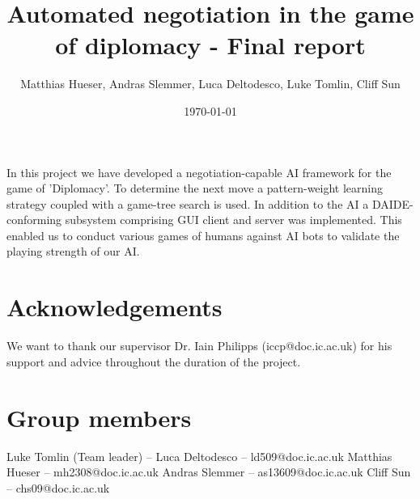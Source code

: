 \documentclass[11pt]{article} \usepackage{fullpage} \usepackage{cite}
\title{Automated negotiation in the game of diplomacy - Final report}
\author{Matthias Hueser, Andras Slemmer, Luca Deltodesco, Luke Tomlin, Cliff
  Sun} \date{\today}
\begin{document}
\maketitle

\begin{Abstract}

In this project we have developed a negotiation-capable AI framework for the
game of 'Diplomacy'. To determine the next move a pattern-weight learning
strategy \cite{Shapiro02learninga} coupled with a game-tree search is used. In
addition to the AI a DAIDE-conforming \cite{daidewebsite} subsystem comprising
GUI client and server was implemented. This enabled us to conduct various games
of humans against AI bots to validate the playing strength of our AI.

\end{Abstract}

\tableofcontents

\section{Acknowledgements}

We want to thank our supervisor Dr. Iain Philipps (iccp@doc.ic.ac.uk) for his
support and advice throughout the duration of the project.

\section{Group members} 
Luke Tomlin (Team leader) -- Luca Deltodesco -- ld509@doc.ic.ac.uk Matthias
Hueser -- mh2308@doc.ic.ac.uk Andras Slemmer -- as13609@doc.ic.ac.uk Cliff Sun
-- chs09@doc.ic.ac.uk
\end{document}
